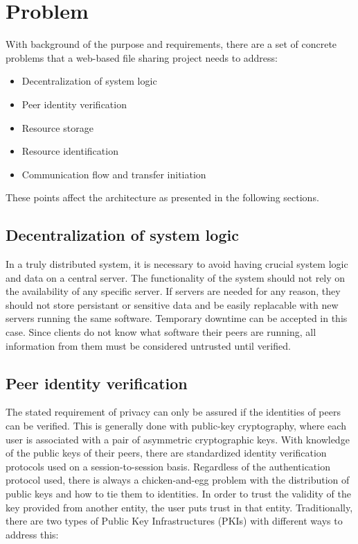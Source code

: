 \section{Problem}
\label{sec:problem}

With background of the purpose and requirements, there are a set of concrete problems that a web-based file sharing project needs to address:

\begin{itemize}
\item Decentralization of system logic
\item Peer identity verification
\item Resource storage
\item Resource identification
\item Communication flow and transfer initiation
\end{itemize}

These points affect the architecture as presented in the following sections.

\subsection{Decentralization of system logic}
In a truly distributed system, it is necessary to avoid having crucial system logic and data on a central server. The functionality of the system should not rely on the availability of any specific server. If servers are needed for any reason, they should not store persistant or sensitive data and be easily replacable with new servers running the same software. Temporary downtime can be accepted in this case. Since clients do not know what software their peers are running, all information from them must be considered untrusted until verified.

\subsection{Peer identity verification}
The stated requirement of privacy can only be assured if the identities of peers can be verified. This is generally done with public-key cryptography, where each user is associated with a pair of asymmetric cryptographic keys. With knowledge of the public keys of their peers, there are standardized identity verification protocols used on a session-to-session basis. Regardless of the authentication protocol used, there is always a chicken-and-egg problem with the distribution of public keys and how to tie them to identities. In order to trust the validity of the key provided from another entity, the user puts trust in that entity. Traditionally, there are two types of Public Key Infrastructures (PKIs) with different ways to address this:

